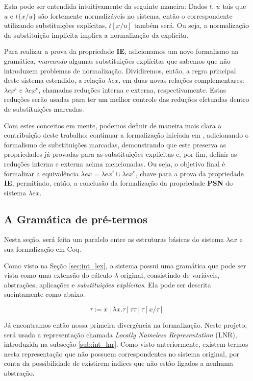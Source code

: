 Esta pode ser entendida intuitivamente da seguinte maneira: Dados $t$, $u$ tais
que $u$ e $t\{x/u\}$ são fortemente normalizáveis no sistema, então o
correspondente utilizando substituições explícitas, $t[x/u]$ também será. Ou
seja, a normalização da substituição implícita implica a normalização da
explícita.

Para realizar a prova da propriedade \textbf{IE}, adicionamos um novo formalismo
na gramática, \emph{marcando} algumas substituições explícitas que sabemos que
não introduzem problemas de normalização. Dividiremos, então, a regra principal
deste sistema estendido, a relação $\lambda \underline{ex}$, em duas novas
relações complementares: $\lambda \underline{ex}^i$ e $\lambda
\underline{ex}^e$, chamadas reduções interna e externa, respectivamente. Estas
reduções serão usadas para ter um melhor controle das reduções efetuadas dentro
de substituições marcadas.

Com estes conceitos em mente, podemos definir de maneira mais clara a
contribuição deste trabalho: continuar a formalização iniciada em \cite{initial},
adicionando o formalismo de substituições marcadas, demonstrando que este
preserva as propriedades já provadas para as substituições explícitas e, por
fim, definir as reduções interna e externa acima mencionadas. Ou seja, o
objetivo final é formalizar a equivalência $\lambda \underline{ex} = \lambda
\underline{ex}^i \cup \lambda \underline{ex}^e$, chave para a prova da
propriedade \textbf{IE}, permitindo, então, a conclusão da formalização da
propriedade \textbf{PSN} do sistema $\lambda ex$.

\subsection{A Gramática de pré-termos}
\label{sec:termos}

Nesta seção, será feita um paralelo entre as estruturas básicas do sistema
$\lambda ex$ e sua formalização em Coq.

Como visto na Seção \ref{sec:int_lex}, o sistema possui uma gramática que pode
ser vista como uma extensão do cálculo $\lambda$ original, consistindo de
variáveis, abstrações, aplicações e \emph{substituições explícitas}. Ela pode
ser descrita sucintamente como abaixo.

\[ \tau := x\ |\ \lambda x.\tau\ |\ \tau \tau\ |\ \tau[x/\tau]\ \]

Já encontramos então nossa primeira divergência na formalização. Neste projeto,
será usada a representação chamada \textit{Locally Nameless Representation}
(LNR), introduzida na subseção \ref{sub:int_lnr}. Como visto anteriormente,
existem termos nesta representação que não possuem correspondentes no sistema
original, por conta da possibilidade de existirem índices que não estão ligados
a nenhuma abstração.

